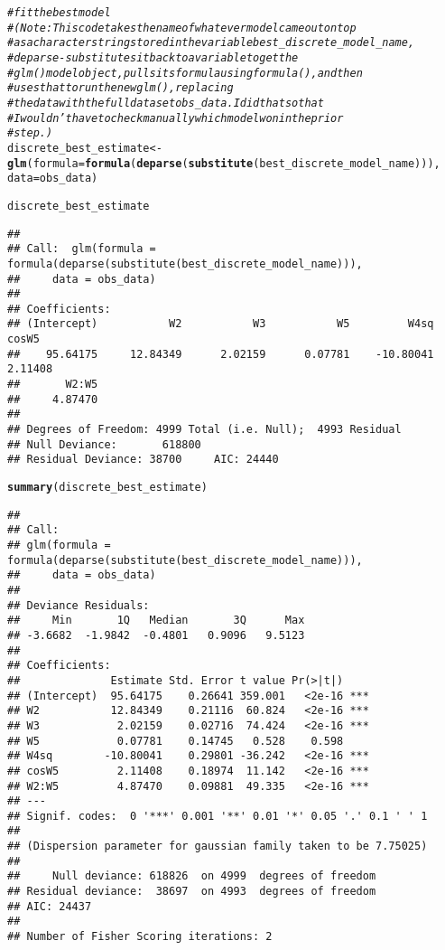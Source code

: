 \documentclass{article}\usepackage[]{graphicx}\usepackage[]{xcolor}
\makeatletter
\newcommand{\hlcom}[1]{\textcolor[rgb]{0.678,0.584,0.686}{\textit{#1}}}%
\newcommand{\hlstd}[1]{\textcolor[rgb]{0.345,0.345,0.345}{#1}}%
\newcommand{\hlkwb}[1]{\textcolor[rgb]{0.69,0.353,0.396}{#1}}%
\newcommand{\hlkwc}[1]{\textcolor[rgb]{0.333,0.667,0.333}{#1}}%
\newcommand{\hlkwd}[1]{\textcolor[rgb]{0.737,0.353,0.396}{\textbf{#1}}}%
\newenvironment{kframe}{%
 \def\at@end@of@kframe{}%
 \ifinner\ifhmode%
  \def\at@end@of@kframe{\end{minipage}}%
  \begin{minipage}{\columnwidth}%
 \fi\fi%
 \def\FrameCommand##1{\hskip\@totalleftmargin \hskip-\fboxsep
 \colorbox{shadecolor}{##1}\hskip-\fboxsep
     \hskip-\linewidth \hskip-\@totalleftmargin \hskip\columnwidth}%
 \MakeFramed {\advance\hsize-\width
   \@totalleftmargin\z@ \linewidth\hsize
   \@setminipage}}%
 {\par\unskip\endMakeFramed%
 \at@end@of@kframe}
\newenvironment{knitrout}{}{} %
\makeatother
\begin{document}
\begin{knitrout}
\color{fgcolor}\begin{kframe}
\begin{alltt}
\hlcom{# fit the best model }
\hlcom{# (Note: This code takes the name of whatever model came out on top}
\hlcom{#  as a character string stored in the variable best_discrete_model_name,}
\hlcom{#  deparse-substitutes it back to a variable to get the }
\hlcom{#  glm() model object, pulls its formula using formula(), and then }
\hlcom{#  uses that to run the new glm(), replacing}
\hlcom{#  the data with the full dataset obs_data. I did that so that }
\hlcom{#  I wouldn't have to check manually which model won in the prior}
\hlcom{#  step.)}
\hlstd{discrete_best_estimate} \hlkwb{<-}
  \hlkwd{glm}\hlstd{(}\hlkwc{formula} \hlstd{=} \hlkwd{formula}\hlstd{(}\hlkwd{deparse}\hlstd{(}\hlkwd{substitute}\hlstd{(best_discrete_model_name))),}
      \hlkwc{data} \hlstd{= obs_data)}

\hlstd{discrete_best_estimate}
\end{alltt}
\begin{verbatim}
## 
## Call:  glm(formula = formula(deparse(substitute(best_discrete_model_name))), 
##     data = obs_data)
## 
## Coefficients:
## (Intercept)           W2           W3           W5         W4sq        cosW5  
##    95.64175     12.84349      2.02159      0.07781    -10.80041      2.11408  
##       W2:W5  
##     4.87470  
## 
## Degrees of Freedom: 4999 Total (i.e. Null);  4993 Residual
## Null Deviance:	    618800 
## Residual Deviance: 38700 	AIC: 24440
\end{verbatim}
\begin{alltt}
\hlkwd{summary}\hlstd{(discrete_best_estimate)}
\end{alltt}
\begin{verbatim}
## 
## Call:
## glm(formula = formula(deparse(substitute(best_discrete_model_name))), 
##     data = obs_data)
## 
## Deviance Residuals: 
##     Min       1Q   Median       3Q      Max  
## -3.6682  -1.9842  -0.4801   0.9096   9.5123  
## 
## Coefficients:
##              Estimate Std. Error t value Pr(>|t|)    
## (Intercept)  95.64175    0.26641 359.001   <2e-16 ***
## W2           12.84349    0.21116  60.824   <2e-16 ***
## W3            2.02159    0.02716  74.424   <2e-16 ***
## W5            0.07781    0.14745   0.528    0.598    
## W4sq        -10.80041    0.29801 -36.242   <2e-16 ***
## cosW5         2.11408    0.18974  11.142   <2e-16 ***
## W2:W5         4.87470    0.09881  49.335   <2e-16 ***
## ---
## Signif. codes:  0 '***' 0.001 '**' 0.01 '*' 0.05 '.' 0.1 ' ' 1
## 
## (Dispersion parameter for gaussian family taken to be 7.75025)
## 
##     Null deviance: 618826  on 4999  degrees of freedom
## Residual deviance:  38697  on 4993  degrees of freedom
## AIC: 24437
## 
## Number of Fisher Scoring iterations: 2
\end{verbatim}
\end{kframe}
\end{knitrout}
\end{document}
